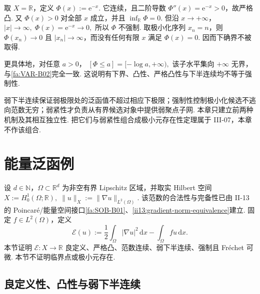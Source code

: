 \begin{FACounterexample}
取 \(\displaystyle X=\mathbb R\)，定义
\(\displaystyle \Phi(x):=\mathrm{e}^{-x}.\)
它连续，且二阶导数 \(\displaystyle\Phi''(x)=\mathrm{e}^{-x}>0\)，故严格凸. 又 \(\displaystyle\Phi(x)>0\) 对全部 \(\displaystyle x\) 成立，并且 \(\displaystyle\inf_{\mathbb R}\Phi=0\). 但沿 \(\displaystyle x\to+\infty\)，
\(\displaystyle |x|\to\infty, \; \Phi(x)=\mathrm{e}^{-x}\to0,\)
所以 \(\displaystyle\Phi\) 不强制. 取极小化序列 \(\displaystyle x_n=n\)，则 \(\displaystyle\Phi(x_n)\to0\) 且 \(\displaystyle|x_n|\to\infty\)，而没有任何有限 \(\displaystyle x\) 满足 \(\displaystyle\Phi(x)=0\). 因而下确界不被取得.

更具体地，对任意 \(\displaystyle a>0\)，
\(\displaystyle [\Phi\leqslant a] = [-\log a,+\infty),\)
该子水平集向 \(\displaystyle+\infty\) 无界，与\autoref{fa:VAR-B02}完全一致. 这说明有下界、凸性、严格凸性与下半连续均不等于强制性.
\end{FACounterexample}

\begin{FARemark}[三个独立机制]
弱下半连续保证弱极限处的泛函值不超过相应下极限；强制性控制极小化候选不逃向范数无穷；弱紧性才负责从有界候选对象中提供弱聚点子网. 本章只建立前两种机制及其相互独立性. 把它们与弱紧性组合成极小元存在性定理属于 III-07，本章不作该组合.
\end{FARemark}

\section{能量泛函例}\label{sec:iii06-energy}

\begin{FAApplication}[椭圆能量泛函]
设 \(\displaystyle d\in\mathbb N\)，\(\displaystyle\Omega\subset\mathbb R^d\) 为非空有界 Lipschitz 区域，并取实 Hilbert 空间
\(\displaystyle X:=H_0^1(\Omega;\mathbb R), \; \|u\|_X:=\|\nabla u\|_{L^2(\Omega)}.\)
该范数的合法性与完备性已由 II-13 的 Poincaré/能量空间接口\autoref{fa:SOB-B01}、\autoref{ii13:gradient-norm-equivalence}建立. 固定 \(\displaystyle f\in L^2(\Omega)\)，定义
\[
\mathcal E(u)
:=
\frac{1}{2}\int_\Omega|\nabla u|^2\,\mathrm{d}x
-
\int_\Omega fu\,\mathrm{d}x.
\]
本节证明 \(\displaystyle\mathcal E:X\to\mathbb R\) 良定义、严格凸、范数连续、弱下半连续、强制且 Fréchet 可微. 本节不证明临界点或极小元存在.
\end{FAApplication}

\subsection{良定义性、凸性与弱下半连续}

